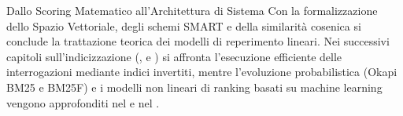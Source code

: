 \begin{noteblock}{Dallo Scoring Matematico all'Architettura di Sistema}
Con la formalizzazione dello Spazio Vettoriale, degli schemi SMART e della similarit\`a cosenica si conclude la trattazione teorica dei modelli di reperimento lineari. Nei successivi capitoli sull'indicizzazione (,  e ) si affronta l'esecuzione efficiente delle interrogazioni mediante indici invertiti, mentre l'evoluzione probabilistica (Okapi BM25 e BM25F) e i modelli non lineari di ranking basati su machine learning vengono approfonditi nel  e nel .
\end{noteblock}